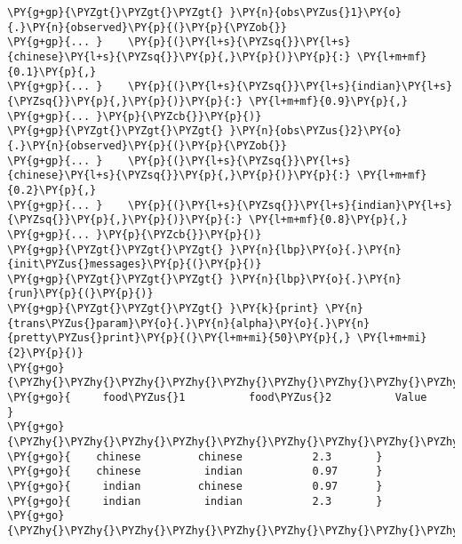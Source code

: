 \begin{example}
\caption{Využití modelu pro nová pozorování}
\label{lst:epint}
\begin{Verbatim}[commandchars=\\\{\}]
\PY{g+gp}{\PYZgt{}\PYZgt{}\PYZgt{} }\PY{n}{obs\PYZus{}1}\PY{o}{.}\PY{n}{observed}\PY{p}{(}\PY{p}{\PYZob{}}
\PY{g+gp}{... }    \PY{p}{(}\PY{l+s}{\PYZsq{}}\PY{l+s}{chinese}\PY{l+s}{\PYZsq{}}\PY{p}{,}\PY{p}{)}\PY{p}{:} \PY{l+m+mf}{0.1}\PY{p}{,}
\PY{g+gp}{... }    \PY{p}{(}\PY{l+s}{\PYZsq{}}\PY{l+s}{indian}\PY{l+s}{\PYZsq{}}\PY{p}{,}\PY{p}{)}\PY{p}{:} \PY{l+m+mf}{0.9}\PY{p}{,}
\PY{g+gp}{... }\PY{p}{\PYZcb{}}\PY{p}{)}      
\PY{g+gp}{\PYZgt{}\PYZgt{}\PYZgt{} }\PY{n}{obs\PYZus{}2}\PY{o}{.}\PY{n}{observed}\PY{p}{(}\PY{p}{\PYZob{}}
\PY{g+gp}{... }    \PY{p}{(}\PY{l+s}{\PYZsq{}}\PY{l+s}{chinese}\PY{l+s}{\PYZsq{}}\PY{p}{,}\PY{p}{)}\PY{p}{:} \PY{l+m+mf}{0.2}\PY{p}{,}
\PY{g+gp}{... }    \PY{p}{(}\PY{l+s}{\PYZsq{}}\PY{l+s}{indian}\PY{l+s}{\PYZsq{}}\PY{p}{,}\PY{p}{)}\PY{p}{:} \PY{l+m+mf}{0.8}\PY{p}{,}
\PY{g+gp}{... }\PY{p}{\PYZcb{}}\PY{p}{)}   
\PY{g+gp}{\PYZgt{}\PYZgt{}\PYZgt{} }\PY{n}{lbp}\PY{o}{.}\PY{n}{init\PYZus{}messages}\PY{p}{(}\PY{p}{)}
\PY{g+gp}{\PYZgt{}\PYZgt{}\PYZgt{} }\PY{n}{lbp}\PY{o}{.}\PY{n}{run}\PY{p}{(}\PY{p}{)}
\PY{g+gp}{\PYZgt{}\PYZgt{}\PYZgt{} }\PY{k}{print} \PY{n}{trans\PYZus{}param}\PY{o}{.}\PY{n}{alpha}\PY{o}{.}\PY{n}{pretty\PYZus{}print}\PY{p}{(}\PY{l+m+mi}{50}\PY{p}{,} \PY{l+m+mi}{2}\PY{p}{)}        
\PY{g+go}{\PYZhy{}\PYZhy{}\PYZhy{}\PYZhy{}\PYZhy{}\PYZhy{}\PYZhy{}\PYZhy{}\PYZhy{}\PYZhy{}\PYZhy{}\PYZhy{}\PYZhy{}\PYZhy{}\PYZhy{}\PYZhy{}\PYZhy{}\PYZhy{}\PYZhy{}\PYZhy{}\PYZhy{}\PYZhy{}\PYZhy{}\PYZhy{}\PYZhy{}\PYZhy{}\PYZhy{}\PYZhy{}\PYZhy{}\PYZhy{}\PYZhy{}\PYZhy{}\PYZhy{}\PYZhy{}\PYZhy{}\PYZhy{}\PYZhy{}\PYZhy{}\PYZhy{}\PYZhy{}\PYZhy{}\PYZhy{}\PYZhy{}\PYZhy{}\PYZhy{}\PYZhy{}\PYZhy{}\PYZhy{}\PYZhy{}\PYZhy{}}
\PY{g+go}{     food\PYZus{}1          food\PYZus{}2          Value      }
\PY{g+go}{\PYZhy{}\PYZhy{}\PYZhy{}\PYZhy{}\PYZhy{}\PYZhy{}\PYZhy{}\PYZhy{}\PYZhy{}\PYZhy{}\PYZhy{}\PYZhy{}\PYZhy{}\PYZhy{}\PYZhy{}\PYZhy{}\PYZhy{}\PYZhy{}\PYZhy{}\PYZhy{}\PYZhy{}\PYZhy{}\PYZhy{}\PYZhy{}\PYZhy{}\PYZhy{}\PYZhy{}\PYZhy{}\PYZhy{}\PYZhy{}\PYZhy{}\PYZhy{}\PYZhy{}\PYZhy{}\PYZhy{}\PYZhy{}\PYZhy{}\PYZhy{}\PYZhy{}\PYZhy{}\PYZhy{}\PYZhy{}\PYZhy{}\PYZhy{}\PYZhy{}\PYZhy{}\PYZhy{}\PYZhy{}\PYZhy{}\PYZhy{}}
\PY{g+go}{    chinese         chinese           2.3       }
\PY{g+go}{    chinese          indian           0.97      }
\PY{g+go}{     indian         chinese           0.97      }
\PY{g+go}{     indian          indian           2.3       }
\PY{g+go}{\PYZhy{}\PYZhy{}\PYZhy{}\PYZhy{}\PYZhy{}\PYZhy{}\PYZhy{}\PYZhy{}\PYZhy{}\PYZhy{}\PYZhy{}\PYZhy{}\PYZhy{}\PYZhy{}\PYZhy{}\PYZhy{}\PYZhy{}\PYZhy{}\PYZhy{}\PYZhy{}\PYZhy{}\PYZhy{}\PYZhy{}\PYZhy{}\PYZhy{}\PYZhy{}\PYZhy{}\PYZhy{}\PYZhy{}\PYZhy{}\PYZhy{}\PYZhy{}\PYZhy{}\PYZhy{}\PYZhy{}\PYZhy{}\PYZhy{}\PYZhy{}\PYZhy{}\PYZhy{}\PYZhy{}\PYZhy{}\PYZhy{}\PYZhy{}\PYZhy{}\PYZhy{}\PYZhy{}\PYZhy{}\PYZhy{}\PYZhy{}}
\end{Verbatim}
\end{example}


